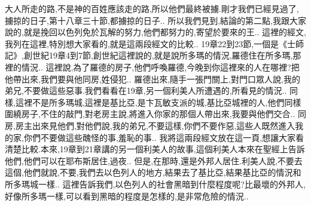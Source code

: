 \documentclass{book}
\begin{document}
大人所走的路,不是神的百姓應該走的路,所以他們最終被擄.剛才我們已經見過了,擄掠的日子,第十八章三十節,都擄掠的日子..
所以我們見到,結論的第二點,我跟大家說的,就是挽回以色列免於瓦解的努力,他們都努力的,寄望於要來的王..
這裡的經文,我列在這裡,特別想大家看的,就是這兩段經文的比較..
19章22到23節,一個是《士師記》,創世紀19章4到7節,創世紀這裡說的,就是說所多瑪的情況,羅德住在所多瑪,那裡的情況..
這裡說,為了羅德的房子,他們呼喚羅德,今晚到你這裡來的人在哪裡?把他帶出來,我們要與他同房,姓侵犯..
羅德出來,隨手一張門關上,對門口眾人說,我的弟兄,不要做這些惡事.我們看看在19章,另一個利美人所遭遇的,所看見的情況..
同樣,這裡不是所多瑪城,這裡是基比亞,是卞瓦敏支派的城,基比亞城裡的人,他們同樣圍繞房子,不住的敲門,對老房主說,將進入你家的那個人帶出來,我要與他們交合..
同房,房主出來見他們,對他們說,我的弟兄,不要這樣,你們不要作惡,這些人既然進入我的家,你們不要做這些醜怪的事,羞恥的事..
我將這兩段經文放在這一頁,想讓大家看清楚比較.本來,19章到21章講的另一個利美人的故事,這個利美人本來在聖經上告訴他們,他們可以在耶布斯居住,過夜..
但是,在那時,還是外邦人居住.利美人說,不要去這個,他們就說,不要,我們去以色列人的地方,結果去了基比亞,結果基比亞的情況和所多瑪城一樣..
這裡告訴我們,以色列人的社會黑暗到什麼程度呢?比最壞的外邦人,好像所多瑪一樣,可以看到黑暗的程度是怎樣的,是非常危險的情況..
\end{document}
